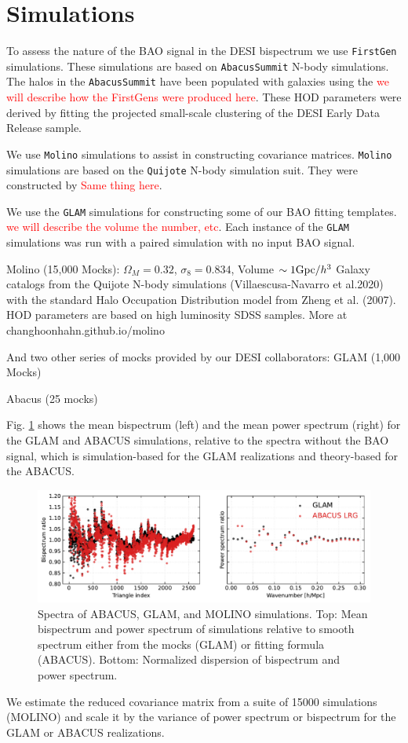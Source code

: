 \section{Simulations}
\label{sec:simulations}

To assess the nature of the BAO signal in the DESI bispectrum we use \texttt{FirstGen} simulations. These simulations are based on \texttt{AbacusSummit} N-body simulations. The halos in the \texttt{AbacusSummit} have been populated with galaxies using the \textcolor{red}{we will describe how the FirstGens were produced here}. These HOD parameters were derived by fitting the projected small-scale clustering of the DESI Early Data Release sample. 

We use \texttt{Molino} simulations to assist in constructing covariance matrices. \texttt{Molino} simulations are based on the \texttt{Quijote} N-body simulation suit. They were constructed by \textcolor{red}{Same thing here}.

We use the \texttt{GLAM} simulations for constructing some of our BAO fitting templates. \textcolor{red}{we will describe the volume the number, etc}. Each instance of the \texttt{GLAM} simulations was run with a paired simulation with no input BAO signal. 

Molino (15,000 Mocks): 
$\Omega_{M}=0.32$, $\sigma_{8}=0.834$, Volume $\sim 1 {\rm Gpc}/h^{3}$ 
Galaxy catalogs from the Quijote N-body simulations (Villaescusa-Navarro et al.2020) with the standard Halo Occupation Distribution model from Zheng et al. (2007). HOD parameters are based on high luminosity SDSS samples. More at changhoonhahn.github.io/molino

And two other series of mocks provided by our DESI collaborators:
GLAM (1,000 Mocks)

Abacus (25 mocks)


Fig. \ref{fig:data} shows the mean bispectrum (left) and the mean power spectrum (right) for the GLAM and ABACUS simulations, relative to the spectra without the BAO signal, which is simulation-based for the GLAM realizations and theory-based for the ABACUS.

\begin{figure}
\includegraphics[width=\textwidth]{figures/spectra.pdf}
\caption{Spectra of ABACUS, GLAM, and MOLINO simulations. Top: Mean bispectrum and power spectrum of simulations relative to smooth spectrum either from the mocks (GLAM) or fitting formula (ABACUS). Bottom: Normalized dispersion of bispectrum and power spectrum.}\label{fig:data}
\end{figure}


We estimate the reduced covariance matrix from a suite of 15000 simulations (MOLINO) and scale it by the variance of power spectrum or bispectrum for the GLAM or ABACUS realizations.